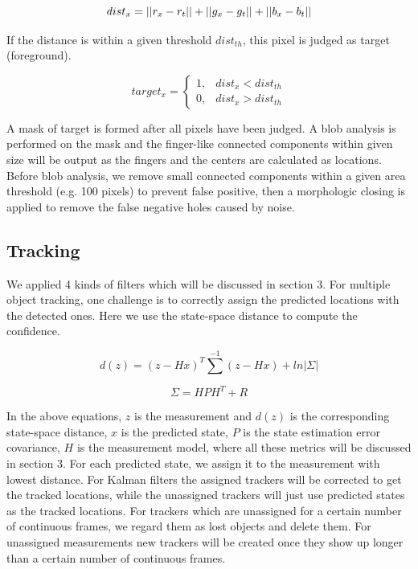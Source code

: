 \documentclass[10pt,twocolumn,letterpaper]{article}
\begin{document}
\begin{equation}
dist_x=||r_x-r_t||+||g_x-g_t||+||b_x-b_t||\\
\end{equation}

If the distance is within a given threshold $dist_{th}$, this pixel is judged as target (foreground).

\begin{equation}
	target_x=
\begin{cases}
	1, & dist_x<dist_{th}\\
	0, & dist_x>dist_{th}
\end{cases}
\end{equation}

A mask of target is formed after all pixels have been judged. A blob analysis is performed on the mask and the finger-like connected components within given size will be output as the fingers and the centers are calculated as locations. Before blob analysis, we remove small connected components within a given area threshold (e.g. 100 pixels) to prevent false positive, then a morphologic closing is applied to remove the false negative holes caused by noise.

\subsection{Tracking}
We applied 4 kinds of filters which will be discussed in section 3. For multiple object tracking, one challenge is to correctly assign the predicted locations with the detected ones. Here we use the state-space distance \cite{ref:welch1995introduction} to compute the confidence.

\begin{equation}
d(z)=(z-Hx)^T\sum^{-1} (z-Hx)+ln|\Sigma|
\end{equation}

\begin{equation}
\Sigma=HPH^T+R
\end{equation}

In the above equations, $z$ is the measurement and $d(z)$ is the corresponding state-space distance, $x$ is the predicted state, $P$ is the state estimation error covariance, $H$ is the measurement model, where all these metrics will be discussed in section 3. For each predicted state, we assign it to the measurement with lowest distance. For Kalman filters the assigned trackers will be corrected to get the tracked locations, while the unassigned trackers will just use predicted states as the tracked locations. For trackers which are unassigned for a certain number of continuous frames, we regard them as lost objects and delete them. For unassigned measurements new trackers will be created once they show up longer than a certain number of continuous frames.
\end{document}
